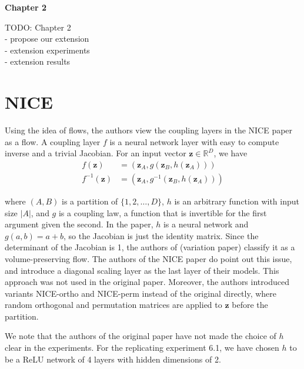 \begin{center}
	{\Large \bfseries  Chapter 2}
\end{center}

TODO: Chapter 2 \\
- propose our extension \\
- extension experiments \\
- extension results

\section*{NICE}

Using the idea of flows, the authors view the coupling layers in the NICE paper as a flow. A coupling layer $f$ is a neural network layer with easy to compute inverse and a trivial Jacobian. For an input vector $\mathbf{z} \in \mathbb{R}^D$, we have
\begin{align*}
    f(\mathbf{z}) &= (\mathbf{z}_A, g(\mathbf{z}_B,h(\mathbf{z}_A)))\\
    f^{-1}(\mathbf{z}) &= (\mathbf{z}_A, g^{-1}(\mathbf{z}_B,h(\mathbf{z}_A)))
\end{align*}

where $(A,B)$ is a partition of $\{1,2,\dots,D\}$, $h$ is an arbitrary function with input size $|A|$, and $g$ is a coupling law, a function that is invertible for the first argument given the second. In the paper, $h$ is a neural network and $g(a,b)=a+b$, so the Jacobian is just the identity matrix. Since the determinant of the Jacobian is 1, the authors of (variation paper) classify it as a volume-preserving flow.
The authors of the NICE paper do point out this issue, and introduce a diagonal scaling layer as the last layer of their models. This approach was not used in the original paper. Moreover, the authors introduced variants NICE-ortho and NICE-perm instead of the original directly, where random orthogonal and permutation matrices are applied to $\mathbf{z}$ before the partition. 

We note that the authors of the original paper have not made the choice of $h$ clear in the experiments. For the replicating experiment 6.1, we have chosen $h$ to be a ReLU network of 4 layers with hidden dimensions of 2.